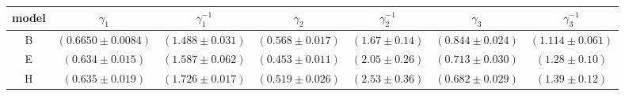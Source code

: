 \begin{tabular}{ccccccc}
\toprule
model & $\gamma_1$ & $\gamma_1^{-1}$ & $\gamma_2$ & $\gamma_2^{-1}$ & $\gamma_3$ & $\gamma_3^{-1}$ \\
\midrule
B & $ (0.6650\pm0.0084) $ & $ (1.488\pm0.031) $ & $ (0.568\pm0.017) $ & $ (1.67\pm0.14) $ & $ (0.844\pm0.024) $ & $ (1.114\pm0.061) $ \\
E & $ (0.634\pm0.015) $ & $ (1.587\pm0.062) $ & $ (0.453\pm0.011) $ & $ (2.05\pm0.26) $ & $ (0.713\pm0.030) $ & $ (1.28\pm0.10) $ \\
H & $ (0.635\pm0.019) $ & $ (1.726\pm0.017) $ & $ (0.519\pm0.026) $ & $ (2.53\pm0.36) $ & $ (0.682\pm0.029) $ & $ (1.39\pm0.12) $ \\
\bottomrule
\end{tabular}
